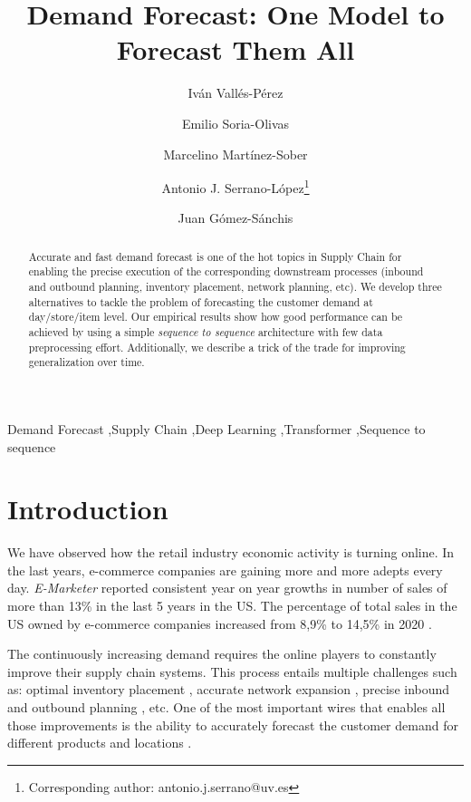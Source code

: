 \documentclass{elsarticle}
\begin{document}
	
	\begin{frontmatter}

		\title{Demand Forecast: One Model to Forecast Them All}
		
		\author[UV]{Iván Vallés-Pérez}
		\author[UV]{Emilio Soria-Olivas}
		\author[UV]{Marcelino Martínez-Sober}
		\author[UV]{Antonio J. Serrano-López\footnote{Corresponding author: antonio.j.serrano@uv.es}}
		\author[UV]{Juan Gómez-Sánchis}

		
		\address[UV]{Escola Tècnica Superior d\textsc{}Enginyeria, University of Valencia, Avenida de la Universitat s/n 46100 Burjassot, Valencia, Spain}
		\begin{abstract}
			Accurate and fast demand forecast is one of the hot topics in Supply Chain for enabling the precise execution of the corresponding downstream processes (inbound and outbound planning, inventory placement, network planning, etc). We develop three alternatives to tackle the problem of forecasting the customer demand at day/store/item level. Our empirical results show how good performance can be achieved by using a simple \textit{sequence to sequence} architecture with few data preprocessing effort. Additionally, we describe a trick of the trade for improving generalization over time.
		\end{abstract}
		
		\begin{keyword}
			Demand Forecast \sep Supply Chain \sep Deep Learning \sep Transformer \sep Sequence to sequence
		\end{keyword}
		
	\end{frontmatter}
	
	\linenumbers
	
	\section{Introduction}
	We have observed how the retail industry economic activity is turning online. In the last years, e-commerce companies are gaining more and more adepts every day. \textit{E-Marketer} reported consistent year on year growths in number of sales of more than 13\% in the last 5 years in the US. The percentage of total sales in the US owned by e-commerce companies increased from 8,9\% to 14,5\% in 2020 \cite{emarketer2019, emarketer2020}.
	
	The continuously increasing demand requires the online players to constantly improve their supply chain systems. This process entails multiple challenges such as: optimal inventory placement \cite{graves2008}, accurate network expansion \cite{hossein2017}, precise inbound and outbound planning \cite{kaipia2009}, etc. One of the most important wires that enables all those improvements is the ability to accurately forecast the customer demand for different products and locations \cite{forslund2007}.  
	
\end{document}
